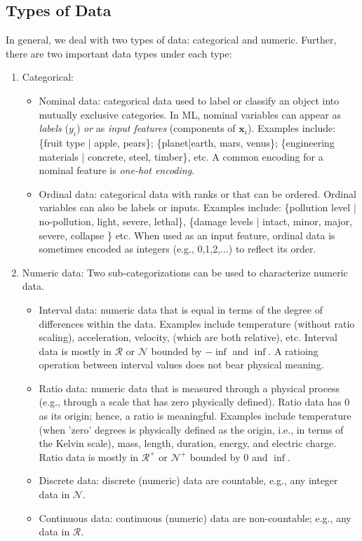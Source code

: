 \documentclass[12pt]{article}
\begin{document}
\subsection{Types of Data}
In general, we deal with two types of data: categorical and numeric. Further, there are two important data types under each type:
\begin{enumerate}
\item Categorical:
\begin{itemize}
\item Nominal data: categorical data used to label or classify an object into mutually exclusive categories. In ML, nominal variables can appear as \textit{labels} ($y_i$) \textit{or} as \textit{input features} (components of $\bm{x}_i$). Examples include: \{fruit type | apple, pears\}; \{planet|earth, mars, venus\}; \{engineering materials | concrete, steel, timber\}, etc. A common encoding for a nominal feature is \textit{one-hot encoding}.
\item Ordinal data: categorical data with ranks or that can be ordered. Ordinal variables can also be labels or inputs. Examples include: \{pollution level | no-pollution, light, severe, lethal\}, \{damage levels | intact, minor, major, severe, collapse \} etc. When used as an input feature, ordinal data is sometimes encoded as integers (e.g., 0,1,2,...) to reflect its order.

\end{itemize}
\item Numeric data: Two sub-categorizations can be used to characterize numeric data. 
\begin{itemize}
\item Interval data: numeric data that is equal in terms of the degree of differences within the data. Examples include temperature (without ratio scaling), acceleration, velocity, (which are both relative), etc. Interval data is mostly in $\mathcal{R}$ or $\mathcal{N}$ bounded by $-\inf$ and $\inf$. A ratioing operation between interval values does not bear physical meaning. 

\item Ratio data: numeric data that is measured through a physical process (e.g., through a scale that has zero physically defined). Ratio data has $0$ as its origin; hence, a ratio is meaningful. Examples include temperature (when 'zero' degrees is physically defined as the origin, i.e., in terms of the Kelvin scale), mass, length, duration, energy, and electric charge. Ratio data is mostly in $\mathcal{R}^+$ or $\mathcal{N}^+$ bounded by $0$ and $\inf$.
\end{itemize}

\begin{itemize}
\item Discrete data: discrete (numeric) data are countable, e.g., any integer data in $\mathcal{N}$.
\item Continuous data: continuous (numeric) data are non-countable; e.g., any data in $\mathcal{R}$.
\end{itemize}

\end{enumerate}
\end{document}

